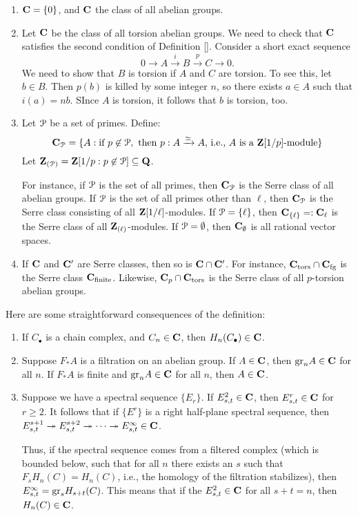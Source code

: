\begin{example}
    \begin{enumerate}
	\item $\mathbf C = \{0\}$, and $\mathbf C$ the class of all abelian groups.
	\item Let $\mathbf C$ be the class of all torsion abelian groups. We need to
	    check that $\mathbf C$ satisfies the second condition of Definition
	    \ref{}. Consider a short exact sequence
	    $$0\to A\xrightarrow{i} B\xrightarrow{p} C\to 0.$$
	    We need to show that $B$ is torsion if $A$ and $C$ are torsion. To
	    see this, let $b\in B$. Then $p(b)$ is killed by some integer $n$,
	    so there exists $a\in A$ such that $i(a) = nb$. SInce $A$ is
	    torsion, it follows that $b$ is torsion, too.
	\item Let $\mathcal P$ be a set of primes. Define:
	    $$
	    \mathbf C_{\mathcal P} = \{ A : \text{if }p\not\in\mathcal P,\text{ then }p:A\xrightarrow{\simeq} A\text{, i.e., }A \text{ is a } \mathbf Z[1/p]\text{-module}\}
	    $$
	    Let $\mathbf Z_{(\mathcal P)} = \mathbf Z[1/p: p\not\in\mathcal P]\subseteq\mathbf Q$.
	    
	    For instance, if $\mathcal P$ is the set of all primes, then $\mathbf C_\mathcal P$ is
	    the Serre class of all abelian groups. If $\mathcal P$ is the set of all
	    primes other than $\ell$, then $\mathbf C_\mathcal P$ is the Serre class
	    consisting of all $\mathbf Z[1/\ell]$-modules. If $\mathcal P = \{\ell\}$, then
	    $\mathbf C_{\{\ell\}} =: \mathbf C_\ell$ is the Serre class of all
	    $\mathbf Z_{(\ell)}$-modules. If $\mathcal P = \emptyset$, then $\mathbf C_\emptyset$
	    is all rational vector spaces.
	\item If $\mathbf C$ and $\mathbf C^\prime$ are Serre classes, then so is $\mathbf C\cap
	    \mathbf C^\prime$. For instance, $\mathbf C_\text{tors} \cap \mathbf C_\text{fg}$ is
	    the Serre class $\mathbf C_\text{finite}$. Likewise, $\mathbf C_p \cap
	    \mathbf C_\text{tors}$ is the Serre class of all $p$-torsion abelian
	    groups.
    \end{enumerate}
\end{example}
Here are some straightforward consequences of the definition:
\begin{enumerate}
    \item If $C_\bullet$ is a chain complex, and $C_n\in \mathbf C$, then
	$H_n(C_\bullet)\in\mathbf C$.
    \item Suppose $F_\ast A$ is a filtration on an abelian group. If
	$A\in\mathbf C$, then $\mathrm{gr}_nA\in\mathbf C$ for all $n$. If $F_\ast A$ is finite
	and $\mathrm{gr}_n A\in\mathbf C$ for all $n$, then $A\in\mathbf C$.
    \item Suppose we have a spectral sequence $\{E_r\}$. If $E^2_{s,t}\in \mathbf C$,
	then $E^r_{s,t}\in \mathbf C$ for $r\geq 2$. It follows that if $\{E^r\}$ is
	a right half-plane spectral sequence, then $E^{s+1}_{s,t}\twoheadrightarrow
	E^{s+2}_{s,t}\twoheadrightarrow\cdots\twoheadrightarrow E^\infty_{s,t}\in\mathbf C$.

        Thus, if the spectral sequence comes from a filtered complex (which is
	bounded below, such that for all $n$ there exists an $s$ such that $F_s
	H_n(C) = H_n(C)$, i.e., the homology of the filtration stabilizes),
	then $E^\infty_{s,t} = \mathrm{gr}_s H_{s+t}(C)$. This means that if the
	$E^2_{s,t}\in\mathbf C$ for all $s+t = n$, then $H_n(C)\in\mathbf C$.
\end{enumerate}

